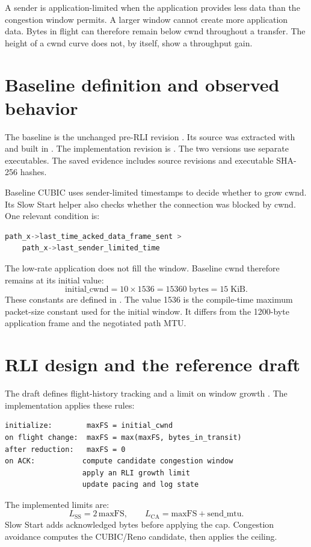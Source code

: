 \documentclass[11pt,a4paper]{article}
\newcommand{\code}[1]{\texttt{\detokenize{#1}}}
\begin{document}
A sender is application-limited when the application provides less data than the congestion window permits.
A larger window cannot create more application data.
Bytes in flight can therefore remain below cwnd throughout a transfer.
The height of a cwnd curve does not, by itself, show a throughput gain.

\section{Baseline definition and observed behavior}
The baseline is the unchanged pre-RLI revision \texttt{\BaselineCommit}.
Its source was extracted with \code{git archive} and built in .
The implementation revision is \texttt{\ImplementationCommit}.
The two versions use separate executables.
The saved evidence includes source revisions and executable SHA-256 hashes.

Baseline CUBIC uses sender-limited timestamps to decide whether to grow cwnd.
Its Slow Start helper also checks whether the connection was blocked by cwnd.
One relevant condition is:
\begin{lstlisting}[language=C]
path_x->last_time_acked_data_frame_sent >
    path_x->last_sender_limited_time
\end{lstlisting}
The low-rate application does not fill the window.
Baseline cwnd therefore remains at its initial value:
\[
  \mathrm{initial\_cwnd} = 10\times 1536 = 15360\;\mathrm{bytes}
  = 15\;\mathrm{KiB}.
\]
These constants are defined in .
The value 1536 is the compile-time maximum packet-size constant used for the initial window.
It differs from the 1200-byte application frame and the negotiated path MTU.

\section{RLI design and the reference draft}
The draft defines flight-history tracking and a limit on window growth \cite{rli}.
The implementation applies these rules:
\begin{lstlisting}
initialize:        maxFS = initial_cwnd
on flight change:  maxFS = max(maxFS, bytes_in_transit)
after reduction:   maxFS = 0
on ACK:           compute candidate congestion window
                  apply an RLI growth limit
                  update pacing and log state
\end{lstlisting}
The implemented limits are:
\[
 L_{\mathrm{SS}} = 2\,\mathrm{maxFS},\qquad
 L_{\mathrm{CA}} = \mathrm{maxFS} + \mathrm{send\_mtu}.
\]
Slow Start adds acknowledged bytes before applying the cap.
Congestion avoidance computes the CUBIC/Reno candidate, then applies the \code{maxFS + send_mtu} ceiling.
\end{document}
